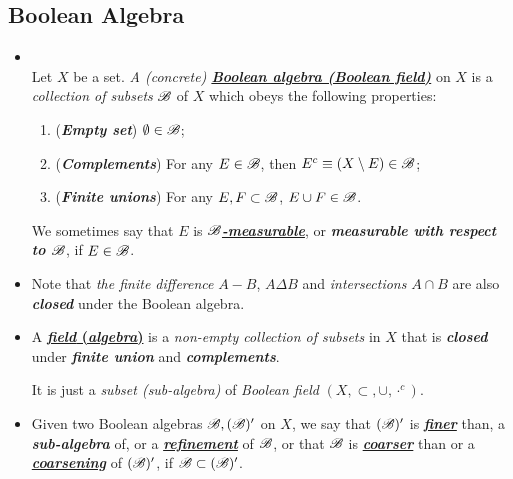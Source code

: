 \documentclass[11pt]{article}
\begin{document}
\subsection{Boolean Algebra}
\begin{itemize}
\item \begin{definition} \citep{tao2011introduction}\\
Let $X$ be a set. \emph{A (concrete) \underline{\textbf{Boolean algebra (Boolean field)}}} on $X$ is a \emph{collection of subsets} ${\mathscr B}$ of $X$ which obeys the following
properties:
\begin{enumerate}
\item (\textbf{\emph{Empty set}}) $\emptyset \in {\mathscr B}$;
\item (\textbf{\emph{Complements}}) For any $E\in {\mathscr B}$, then $E^{c}\equiv (X \setminus E) \in {\mathscr B}$;
\item (\textbf{\emph{Finite unions}}) For any  $E, F \subset {\mathscr B}$, $E\cup F \in {\mathscr B}$.
\end{enumerate}
We sometimes say that $E$ is \underline{\textbf{\emph{${\mathscr B}$-measurable}}}, or \textbf{\emph{measurable with respect to ${\mathscr B}$}}, if $E \in {\mathscr B}$.
\end{definition}

\item \begin{remark}
Note that \emph{the finite difference} $A-B$, $A\Delta B$ and \emph{intersections} $A\cap B$ are also \emph{\textbf{closed}} under the Boolean algebra. 
\end{remark}

\item \begin{definition}
A \underline{\textbf{\emph{field} (\emph{algebra})}} is a \emph{non-empty collection of subsets} in $X$ that is \emph{\textbf{closed}} under \emph{\textbf{finite union}} and \emph{\textbf{complements}}. 

It is just a \emph{subset (sub-algebra)} of \emph{Boolean field} $(X, \subset, \cup, \cdot^{c})$. 
\end{definition} 

\item \begin{definition}
Given two Boolean algebras ${\mathscr B}, ({\mathscr B})'$ on $X$, we say that $({\mathscr B})'$ is \underline{\emph{\textbf{finer}}} than, a \emph{\textbf{sub-algebra}} of, or a \underline{\emph{\textbf{refinement}}} of ${\mathscr B}$, or that ${\mathscr B}$ is \underline{\emph{\textbf{coarser}}} than or a \underline{\emph{\textbf{coarsening}}} of $({\mathscr B})'$, if ${\mathscr B} \subset ({\mathscr B})'$.
\end{definition}


\end{itemize}
\end{document}
